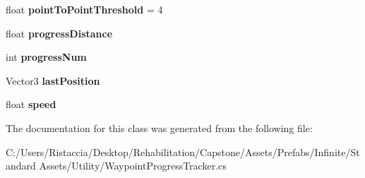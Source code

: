 \begin{DoxyCompactItemize}
float {\bfseries point\+To\+Point\+Threshold} = 4
\item 
\mbox{\label{class_unity_standard_assets_1_1_utility_1_1_waypoint_progress_tracker_a34a6826e4a17cfa3f8361ec57749b6b0}} 
float {\bfseries progress\+Distance}
\item 
\mbox{\label{class_unity_standard_assets_1_1_utility_1_1_waypoint_progress_tracker_a900ac272c6f896c0fae7943aa8b1483e}} 
int {\bfseries progress\+Num}
\item 
\mbox{\label{class_unity_standard_assets_1_1_utility_1_1_waypoint_progress_tracker_a711a2896f1f1a6fee72b7b289d8f4fb4}} 
Vector3 {\bfseries last\+Position}
\item 
\mbox{\label{class_unity_standard_assets_1_1_utility_1_1_waypoint_progress_tracker_a1ee0112da3ead12141e2c9876dbb743e}} 
float {\bfseries speed}
\end{DoxyCompactItemize}


The documentation for this class was generated from the following file\+:\begin{DoxyCompactItemize}
\item 
C\+:/\+Users/\+Ristaccia/\+Desktop/\+Rehabilitation/\+Capstone/\+Assets/\+Prefabs/\+Infinite/\+Standard Assets/\+Utility/Waypoint\+Progress\+Tracker.\+cs\end{DoxyCompactItemize}

